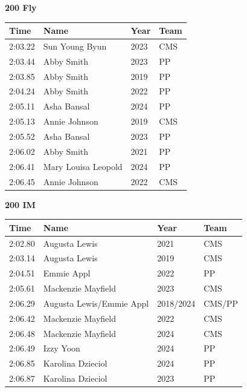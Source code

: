 \vspace{1.2em}
\noindent\begin{minipage}[t]{0.98\textwidth}
\centering
\textbf{\textcolor{teamprimary}{200 Fly}}\par
\vspace{0.5em}
\centering
\small
\renewcommand{\arraystretch}{1.0}
\setlength{\tabcolsep}{4pt}
\begin{tabular}{@{}p{2.5cm}p{4.5cm}p{1.5cm}p{2.5cm}@{}}
\toprule
\textbf{Time} & \textbf{Name} & \textbf{Year} & \textbf{Team} \\
\midrule
2:03.22 & Sun Young Byun & 2023 & CMS \\
2:03.44 & Abby Smith & 2023 & PP \\
2:03.85 & Abby Smith & 2019 & PP \\
2:04.24 & Abby Smith & 2022 & PP \\
2:05.11 & Asha Bansal & 2024 & PP \\
2:05.13 & Annie Johnson & 2019 & CMS \\
2:05.52 & Asha Bansal & 2023 & PP \\
2:06.02 & Abby Smith & 2021 & PP \\
2:06.41 & Mary Louisa Leopold & 2024 & PP \\
2:06.45 & Annie Johnson & 2022 & CMS \\
\bottomrule
\end{tabular}
\end{minipage}
\vspace{1.2em}
\noindent\begin{minipage}[t]{0.98\textwidth}
\centering
\textbf{\textcolor{teamprimary}{200 IM}}\par
\vspace{0.5em}
\centering
\small
\renewcommand{\arraystretch}{1.0}
\setlength{\tabcolsep}{4pt}
\begin{tabular}{@{}p{2.5cm}p{4.5cm}p{1.5cm}p{2.5cm}@{}}
\toprule
\textbf{Time} & \textbf{Name} & \textbf{Year} & \textbf{Team} \\
\midrule
2:02.80 & Augusta Lewis & 2021 & CMS \\
2:03.14 & Augusta Lewis & 2019 & CMS \\
2:04.51 & Emmie Appl & 2022 & PP \\
2:05.61 & Mackenzie Mayfield & 2023 & CMS \\
2:06.29 & Augusta Lewis/Emmie Appl & 2018/2024 & CMS/PP \\
2:06.42 & Mackenzie Mayfield & 2022 & CMS \\
2:06.48 & Mackenzie Mayfield & 2024 & CMS \\
2:06.49 & Izzy Yoon & 2024 & PP \\
2:06.85 & Karolina Dzieciol & 2024 & PP \\
2:06.87 & Karolina Dzieciol & 2023 & PP \\
\bottomrule
\end{tabular}
\end{minipage}
